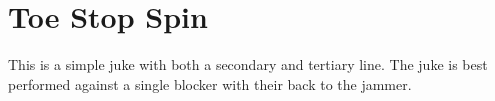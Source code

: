 \section{Toe Stop Spin}

This is a simple juke with both a secondary and tertiary line. 
The juke is best performed against a single blocker with their back to the jammer.

